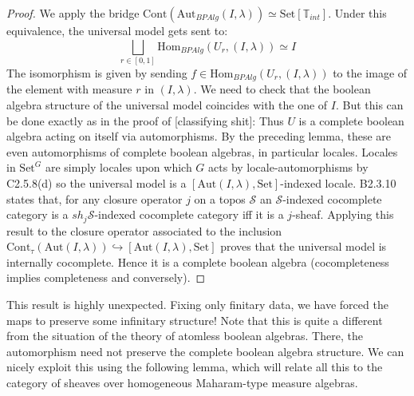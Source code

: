 \documentclass[a4paper]{amsproc}
\theoremstyle{plain}
\theoremstyle{definition}
\theoremstyle{remark}
\numberwithin{equation}{section}
\begin{document}
\begin{proof} We apply the bridge $\text{Cont}(\text{Aut}_{BPAlg}(I,\lambda))\simeq \text{Set}[\mathbb{T}_{int}]$. Under this equivalence, the universal model gets sent to:
\[\bigsqcup_{r\in [0,1]} \text{Hom}_{BPAlg}(U_r, (I,\lambda))\simeq I \]
The isomorphism is given by sending $f\in \text{Hom}_{BPAlg}(U_r, (I,\lambda))$ to the image of the element with measure $r$ in $(I,\lambda)$. We need to check that the boolean algebra structure of the universal model coincides with the one of $I$. But this can be done exactly as in the proof of [classifying shit]:\newline
\indent Thus $U$ is a complete boolean algebra acting on itself via automorphisms. By the preceding lemma, these are even automorphisms of complete boolean algebras, in particular locales. Locales in $\text{Set}^G$ are simply locales upon which $G$ acts by locale-automorphisms by C2.5.8(d) so the universal model is a  $[\text{Aut}(I,\lambda),\text{Set}]$-indexed locale. B2.3.10 states that, for any closure operator $j$ on a topos $\mathcal{S}$ an $\mathcal{S}$-indexed cocomplete category is a  $sh_j\mathcal{S}$-indexed cocomplete category iff it is a $j$-sheaf. Applying this result to the closure operator associated to the inclusion $\text{Cont}_\tau(\text{Aut}(I,\lambda))\hookrightarrow [\text{Aut}(I,\lambda),\text{Set}]$ proves that the universal model is internally cocomplete. Hence it is a complete boolean algebra (cocompleteness implies completeness and conversely).
\end{proof}
This result is highly unexpected. Fixing only finitary data, we have forced the maps to preserve some infinitary structure! Note that this is quite a different from the situation of the theory of atomless boolean algebras. There, the automorphism need not preserve the complete boolean algebra structure. We can nicely exploit this using the following lemma, which will relate all this to the category of sheaves over homogeneous Maharam-type measure algebras.
\end{document}
